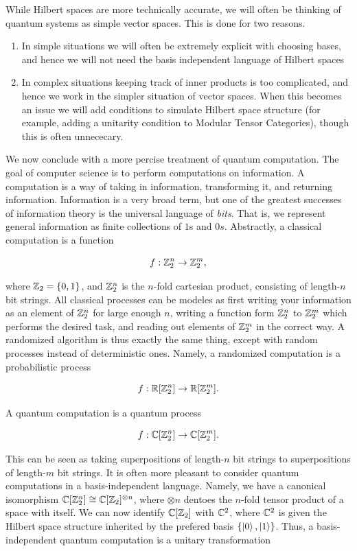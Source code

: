 \documentclass{article}
\theoremstyle{definition}
\numberwithin{figure}{section}
\begin{document}
While Hilbert spaces are more technically accurate, we will often be thinking of quantum systems as simple vector spaces. This is done for two reasons.

\begin{enumerate}
\item In simple situations we will often be extremely explicit with choosing bases, and hence we will not need the basis independent language of Hilbert spaces

\item In complex situations keeping track of inner products is too complicated, and hence we work in the simpler situation of vector spaces. When this becomes an issue we will add conditions to simulate Hilbert space structure (for example, adding a unitarity condition to Modular Tensor Categories), though this is often unnececary.
\end{enumerate}

We now conclude with a more percise treatment of quantum computation. The goal of computer science is to perform computations on information. A computation is a way of taking in information, transforming it, and returning information. Information is a very broad term, but one of the greatest successes of information theory is the universal language of \textit{bits}. That is, we represent general information as finite collections of $1$s and $0s$. Abstractly, a classical computation is a function

$$f:\mathbb{Z}_2^{n}\to \mathbb{Z}_2^m,$$

where $\mathbb{Z}_2=\{0,1\}$, and $\mathbb{Z}_2^n$ is the $n$-fold cartesian product, consisting of length-$n$ bit strings. All classical processes can be modeles as first writing your information as an element of $\mathbb{Z}_2^n$ for large enough $n$, writing a function form $\mathbb{Z}_2^n$ to $\mathbb{Z}_2^m$ which performs the desired task, and reading out elements of $\mathbb{Z}_2^m$ in the correct way. A randomized algorithm is thus exactly the same thing, except with random processes instead of deterministic ones. Namely, a randomized computation is a probabilistic process

$$f:\mathbb{R}[\mathbb{Z}_2^n]\to \mathbb{R}[\mathbb{Z}_2^m].$$

A quantum computation is a quantum process

$$f:\mathbb{C}[\mathbb{Z}_2^n]\to \mathbb{C}[\mathbb{Z}_2^m].$$

This can be seen as taking superpositions of length-$n$ bit strings to superpositions of length-$m$ bit strings. It is often more pleasant to consider quantum computations in a basis-independent language. Namely, we have a canonical isomorphism $\mathbb{C}[\mathbb{Z}_2^n]\cong \mathbb{C}[\mathbb{Z}_2]^{\otimes n}$, where $\otimes n$ dentoes the $n$-fold tensor product of a space with itself. We can now identify $\mathbb{C}[\mathbb{Z}_2]$ with $\mathbb{C}^2$, where $\mathbb{C}^2$ is given the Hilbert space structure inherited by the prefered basis $\{\left|0\right>,\left|1\right>\}$. Thus, a basis-independent quantum computation is a unitary transformation
\end{document}

